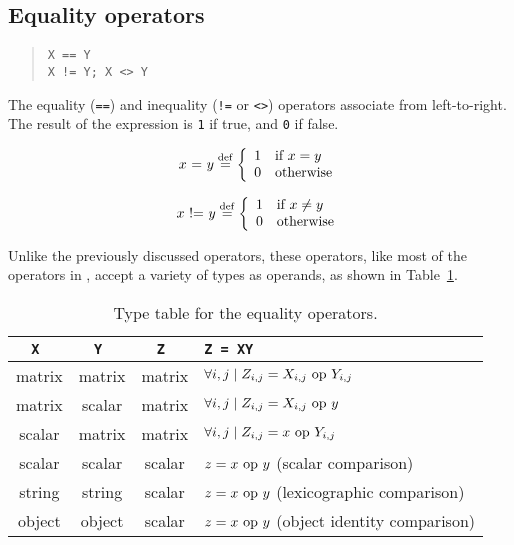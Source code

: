 \subsection{Equality operators}
\label{burlap.op.equality}

\begin{quote}
\begin{verbatim}
X == Y
X != Y; X <> Y
\end{verbatim}
\end{quote}

The equality ({\tt ==}) and inequality ({\tt !=} or {\tt <>})
operators associate from left-to-right.  The result of the expression
is {\tt 1} if true, and {\tt 0} if false.

\begin{displaymath}
x \mbox{ = } y \stackrel{\rm def}{=} \left\{
\begin{array}{ll}
1 & \mbox{if $x = y$} \\
0 & \mbox{otherwise}
\end{array} \right.
\end{displaymath}

\begin{displaymath}
x \mbox{ != } y \stackrel{\rm def}{=} \left\{
\begin{array}{ll}
1 & \mbox{if $x \neq y$} \\
0 & \mbox{otherwise}
\end{array} \right.
\end{displaymath}

Unlike the previously discussed operators, these operators, like most
of the operators in \burlap, accept a variety of types as operands, as
shown in Table~\ref{burlap.equality.types}.

\begin{table}[htbp]
\begin{center}
\begin{tabular}{c|c|c|l}
\tt X  & \tt Y	& \tt Z	 & \tt Z = X\op Y				    \\
\hline
matrix & matrix	& matrix & $\forall i,j \mid Z_{i,j} = X_{i,j} \mbox{\rm\ op } Y_{i,j}$ \\
matrix & scalar	& matrix & $\forall i,j \mid Z_{i,j} = X_{i,j} \mbox{\rm\ op } y$	    \\
scalar & matrix	& matrix & $\forall i,j \mid Z_{i,j} = x \mbox{\rm\ op } Y_{i,j}$	    \\
scalar & scalar & scalar & $z = x \mbox{\rm\ op } y$ (scalar comparison)		    \\
string & string & scalar & $z = x \mbox{\rm\ op } y$ (lexicographic comparison)	    \\
object & object & scalar & $z = x \mbox{\rm\ op } y$ (object identity comparison)	    \\
\end{tabular}
\caption{Type table for the equality operators.}
\label{burlap.equality.types}
\end{center}
\end{table}

